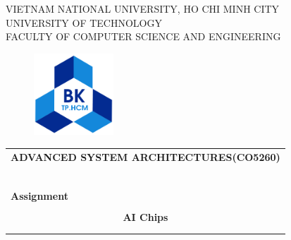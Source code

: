 \documentclass[a4paper]{article}
\begin{document}
\begin{titlepage}
\begin{center}
VIETNAM NATIONAL UNIVERSITY, HO CHI MINH CITY \\
UNIVERSITY OF TECHNOLOGY \\
FACULTY OF COMPUTER SCIENCE AND ENGINEERING
\end{center}

\vspace{1cm}

\begin{figure}[h!]
\begin{center}
\includegraphics[width=3cm]{assets/hcmut.png}
\end{center}
\end{figure}

\vspace{1cm}


\begin{center}
\begin{tabular}{c}
\multicolumn{1}{c}{\textbf{{\Large ADVANCED SYSTEM ARCHITECTURES(CO5260)}}}\\

~~\\
\hline
\\
\multicolumn{1}{l}{\textbf{{\Large Assignment}}}\\
\\
\textbf{{\Huge AI Chips }}
\\
\textbf{{\Huge }}\\
\\
\hline
\end{tabular}
\end{center}

\vspace{1.5cm}


\end{titlepage}
\end{document}
